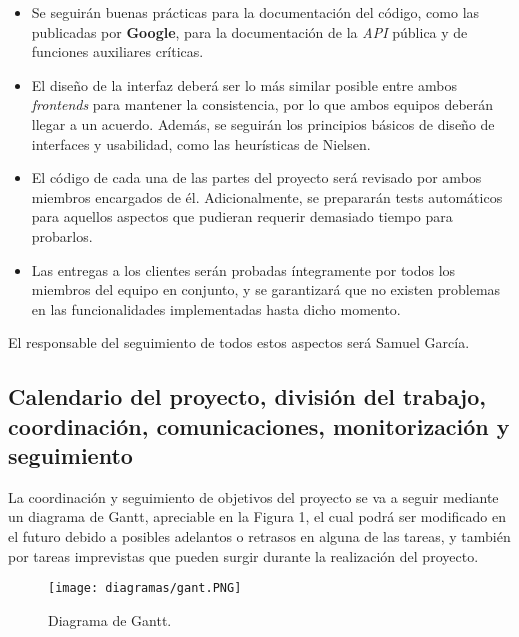 \documentclass[11pt, a4paper, titlepage]{article}
\begin{document}
\begin{itemize}
    \item Se seguirán buenas prácticas para la documentación del código, como las publicadas por \textbf{Google}\textsuperscript{\cite{documentaciongoogle}}, para la documentación de la \textit{API} pública y de funciones auxiliares críticas.
    
    \item El diseño de la interfaz deberá ser lo más similar posible entre ambos \textit{frontends} para mantener la consistencia, por lo que ambos equipos deberán llegar a un acuerdo. Además, se seguirán los principios básicos de diseño de interfaces y usabilidad, como las heurísticas de Nielsen\textsuperscript{\cite{heuristicasnielsen}}.
    
    \item El código de cada una de las partes del proyecto será revisado por ambos miembros encargados de él. Adicionalmente, se prepararán tests automáticos para aquellos aspectos que pudieran requerir demasiado tiempo para probarlos.
    
    \item Las entregas a los clientes serán probadas íntegramente por todos los miembros del equipo en conjunto, y se garantizará que no existen problemas en las funcionalidades implementadas hasta dicho momento.
\end{itemize}

El responsable del seguimiento de todos estos aspectos será Samuel García.

\subsection{Calendario del proyecto, división del trabajo, coordinación, comunicaciones, monitorización y seguimiento}

La coordinación y seguimiento de objetivos del proyecto se va a seguir mediante un diagrama de Gantt, apreciable en la Figura 1, el cual podrá ser modificado en el futuro debido a posibles adelantos o retrasos en alguna de las tareas, y también por tareas imprevistas que pueden surgir durante la realización del proyecto.\\

\begin{landscape}
    \pagestyle{empty}
    \begin{figure}[!p]
    \centering
    \texttt{[image: diagramas/gant.PNG]}
    \caption{Diagrama de Gantt.}
    \label{fig:my_label}
\end{figure}
\end{landscape}
\end{document}
